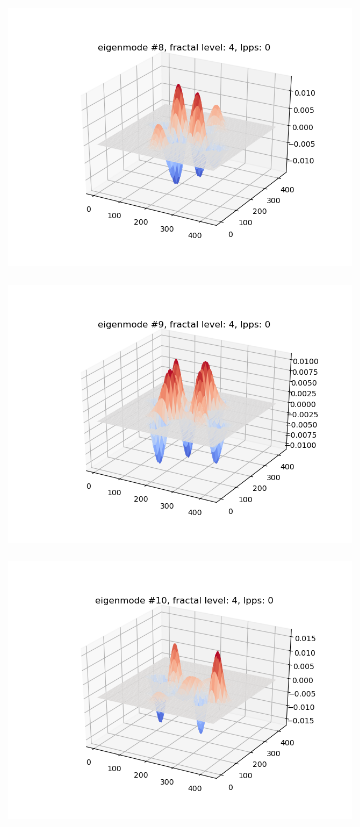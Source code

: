 \documentclass{article}
\begin{document}
\begin{figure}
\begin{subfigure}{0.3\textwidth}
        \includegraphics[width=\linewidth]{../figs/eigenmode_3d8.png}
    \end{subfigure}
    \begin{subfigure}{0.3\textwidth}
        \includegraphics[width=\linewidth]{../figs/eigenmode_3d9.png}
    \end{subfigure}
    \begin{subfigure}{0.3\textwidth}
        \includegraphics[width=\linewidth]{../figs/eigenmode_3d10.png}

\end{subfigure}
\end{figure}
\end{document}
